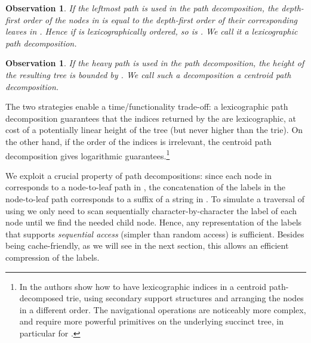 \documentclass[a4paper,11pt]{article}
\newtheorem{observation}[theorem]{Observation}
\theoremstyle{nonumberplain}
\begin{document}
\begin{observation}
  If the leftmost path is used in the path decomposition, the
  depth-first order of the nodes in  is equal to the
  depth-first order of their corresponding leaves in
  . Hence if  is lexicographically ordered,
  so is . We call it a \emph{lexicographic path
    decomposition}.
\end{observation}

\begin{observation}
  \label{obs:centroid}
  If the heavy path is used in the path decomposition, the height of
  the resulting tree is bounded by . We call
  such a decomposition a \emph{centroid path decomposition}.
\end{observation}

The two strategies enable a time/functionality trade-off: a
lexicographic path decomposition guarantees that the indices returned
by the  are lexicographic, at cost of a potentially linear
height of the tree (but never higher than the  trie). On the
other hand, if the order of the indices is irrelevant, the centroid
path decomposition gives logarithmic guarantees.\footnote{In \cite{pods08} the authors show how to have
lexicographic indices in a centroid path-decomposed trie, using
secondary support structures and arranging the nodes in a different
order. The navigational operations are noticeably more
complex, and require more powerful primitives on the underlying
succinct tree, in particular for .}

We exploit a crucial property of path decompositions: since each node
in  corresponds to a node-to-leaf path in
, the concatenation of the labels in the node-to-leaf
path corresponds to a suffix of a string in . To simulate
a traversal of  using  we only need to
scan sequentially character-by-character the label of each node until
we find the needed child node. Hence, any representation of the labels
that supports \emph{sequential access} (simpler than random access) is
sufficient. Besides being cache-friendly, as we will see in the next
section, this allows an efficient compression of the labels.
\end{document}
